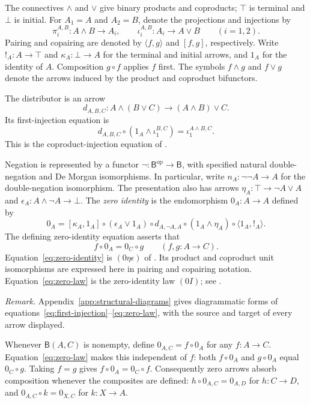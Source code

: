 \documentclass[11pt]{article}
\newcommand{\B}{\mathsf B}
\begin{document}
The connectives $\wedge$ and $\vee$ give binary products and coproducts;
$\top$ is terminal and $\bot$ is initial. For $A_1=A$ and $A_2=B$,
denote the projections and injections by
\[
 \pi_i^{A,B}:A\wedge B\longrightarrow A_i,
 \qquad
 \iota_i^{A,B}:A_i\longrightarrow A\vee B
 \qquad(i=1,2).
\]
Pairing and copairing are denoted
by $\langle f,g\rangle$ and $[f,g]$, respectively. Write
$!_A:A\to\top$ and $\kappa_A:\bot\to A$ for the terminal and initial
arrows, and $1_A$ for the identity of $A$. Composition $g\circ f$
applies $f$ first. The symbols $f\wedge g$ and $f\vee g$ denote the
arrows induced by the product and coproduct bifunctors.

The distributor is an arrow
\[
 d_{A,B,C}:A\wedge(B\vee C)\longrightarrow(A\wedge B)\vee C.
\]
Its first-injection equation is
\begin{equation}
 d_{A,B,C}\circ(1_A\wedge\iota_1^{B,C})
   =\iota_1^{A\wedge B,C}.
 \label{eq:first-injection}
\end{equation}
This is the coproduct-injection equation of
\cite[\S11.1, p.~234]{DP}.

Negation is represented by a functor
$\neg:\B^{\mathrm{op}}\to\B$, with specified natural
double-negation and De Morgan isomorphisms. In particular, write
$n_A:\neg\neg A\to A$ for the double-negation isomorphism.
The presentation also has arrows
$\eta_A:\top\to\neg A\vee A$ and
$\epsilon_A:A\wedge\neg A\to\bot$.
The \emph{zero identity} is the endomorphism $0_A:A\to A$ defined by
\begin{equation}
 0_A=[\kappa_A,1_A]\circ(\epsilon_A\vee1_A)\circ d_{A,\neg A,A}
     \circ(1_A\wedge\eta_A)\circ\langle1_A,!_A\rangle.
 \label{eq:zero-identity}
\end{equation}
The defining zero-identity equation asserts that
\begin{equation}
 f\circ0_A=0_C\circ g
 \qquad(f,g:A\to C).
 \label{eq:zero-law}
\end{equation}
Equation~\eqref{eq:zero-identity} is $(0\eta\epsilon)$ of
\cite[\S14.2, p.~317]{DP}. Its product and coproduct unit isomorphisms
are expressed here in pairing and copairing notation.
Equation~\eqref{eq:zero-law} is the zero-identity law $(0I)$;
see \cite[\S14.3, p.~322]{DP}.

\noindent\textit{Remark.}
Appendix~\ref{app:structural-diagrams} gives diagrammatic forms of
equations~\eqref{eq:first-injection}--\eqref{eq:zero-law}, with the
source and target of every arrow displayed.

Whenever $\B(A,C)$ is nonempty, define $0_{A,C}=f\circ0_A$ for any
$f:A\to C$. Equation~\eqref{eq:zero-law} makes this independent of
$f$: both $f\circ0_A$ and $g\circ0_A$ equal $0_C\circ g$.
Taking $f=g$ gives $f\circ0_A=0_C\circ f$. Consequently zero arrows
absorb composition whenever the composites are defined:
$h\circ0_{A,C}=0_{A,D}$ for $h:C\to D$, and
$0_{A,C}\circ k=0_{X,C}$ for $k:X\to A$.
\end{document}
